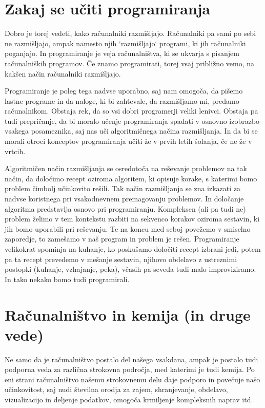 \section{Zakaj se učiti programiranja}

Dobro je torej vedeti, kako računalniki razmišljajo. Računalniki pa sami po sebi ne razmišljajo, ampak namesto njih `razmišljajo` programi, ki jih računalniki poganjajo. In programiranje je veja računalništva, ki se ukvarja s pisanjem računalniških programov. Če znamo programirati, torej vsaj približno vemo, na kakšen način računalniki razmišljajo.

Programiranje je poleg tega nadvse uporabno, saj nam omogoča, da pišemo lastne programe in da naloge, ki bi zahtevale, da razmišljamo mi, predamo računalnikom. Obstaja rek, da so vsi dobri programerji veliki lenivci. Obstaja pa tudi prepričanje, da bi moralo učenje programiranja spadati v osnovno izobrazbo vsakega posameznika, saj nas uči algoritmičnega načina razmišljanja. In da bi se morali otroci konceptov programiranja učiti že v prvih letih šolanja, če ne že v vrtcih.

Algoritmičen način razmišljanja se osredotoča na reševanje problemov na tak način, da določimo recept oziroma algoritem, ki opisuje korake, s katerimi bomo problem čimbolj učinkovito rešili. Tak način razmišljanja se zna izkazati za nadvse koristnega pri vsakodnevnem premagovanju problemov. In določanje algoritma predstavlja osnovo pri programiranju. Kompleksen (ali pa tudi ne) problem želimo v tem kontekstu razbiti na sekvenco korakov oziroma sestavin, ki jih bomo uporabili pri reševanju. Te na koncu med seboj povežemo v smiselno zaporedje, to zamešamo v naš program in problem je rešen. Programiranje velikokrat spominja na kuhanje, ko poskušamo določiti recept izbrani jedi, potem pa ta recept prevedemo v mešanje sestavin, njihovo obdelavo z ustreznimi postopki (kuhanje, vzhajanje, peka), včasih pa seveda tudi malo improviziramo. In tako nekako bomo tudi programirali. 

\section{Računalništvo in kemija (in druge vede)}

Ne samo da je računalništvo postalo del našega vsakdana, ampak je postalo tudi podporna veda za različna strokovna področja, med katerimi je tudi kemija. Po eni strani računalništvo našemu strokovnemu delu daje podporo in povečuje našo učinkovitost, saj nudi številna orodja za zajem, shranjevanje, obdelavo, vizualizacijo in deljenje podatkov, omogoča krmiljenje kompleksnih naprav itd. 

